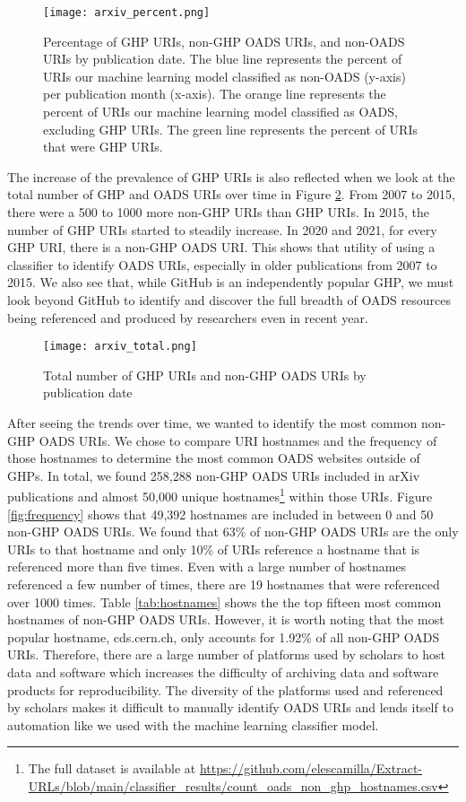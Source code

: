 \begin{figure}
    \centering
    \texttt{[image: arxiv\_percent.png]}
    \caption{Percentage of GHP URIs, non-GHP OADS URIs, and non-OADS URIs by publication date. The blue line represents the percent of URIs our machine learning model classified as non-OADS (y-axis) per publication month (x-axis). The orange line represents the percent of URIs our machine learning model classified as OADS, excluding GHP URIs. The green line represents the percent of URIs that were GHP URIs.}
    \label{fig:arxiv_percent}
\end{figure}

The increase of the prevalence of GHP URIs is also reflected when we look at the total number of GHP and OADS URIs over time in Figure \ref{fig:arxiv_total}. From 2007 to 2015, there were a 500 to 1000 more non-GHP URIs than GHP URIs. In 2015, the number of GHP URIs started to steadily increase. In 2020 and 2021, for every GHP URI, there is a non-GHP OADS URI. This shows that utility of using a classifier to identify OADS URIs, especially in older publications from 2007 to 2015. We also see that, while GitHub is an independently popular GHP, we must look beyond GitHub to identify and discover the full breadth of OADS resources being referenced and produced by researchers even in recent year. 

\begin{figure}
    \centering
    \texttt{[image: arxiv\_total.png]}
    \caption{Total number of GHP URIs and non-GHP OADS URIs by publication date}
    \label{fig:arxiv_total}
\end{figure}

After seeing the trends over time, we wanted to identify the most common non-GHP OADS URIs. We chose to compare URI hostnames and the frequency of those hostnames to determine the most common OADS websites outside of GHPs. In total, we found 258,288 non-GHP OADS URIs included in arXiv publications and almost 50,000 unique hostnames\footnote{The full dataset is available at \url{https://github.com/elescamilla/Extract-URLs/blob/main/classifier\_results/count\_oads\_non\_ghp\_hostnames.csv}} within those URIs. Figure \ref{fig:frequency} shows that 49,392 hostnames are included in between 0 and 50 non-GHP OADS URIs. We found that 63\% of non-GHP OADS URIs are the only URIs to that hostname and only 10\% of URIs reference a hostname that is referenced more than five times. Even with a large number of hostnames referenced a few number of times, there are 19 hostnames that were referenced over 1000 times. Table \ref{tab:hostnames} shows the the top fifteen most common hostnames of non-GHP OADS URIs. However, it is worth noting that the most popular hostname, cds.cern.ch, only accounts for 1.92\% of all non-GHP OADS URIs. Therefore, there are a large number of platforms used by scholars to host data and software which increases the difficulty of archiving data and software products for reproducibility. The diversity of the platforms used and referenced by scholars makes it difficult to manually identify OADS URIs and lends itself to automation like we used with the machine learning classifier model. 

